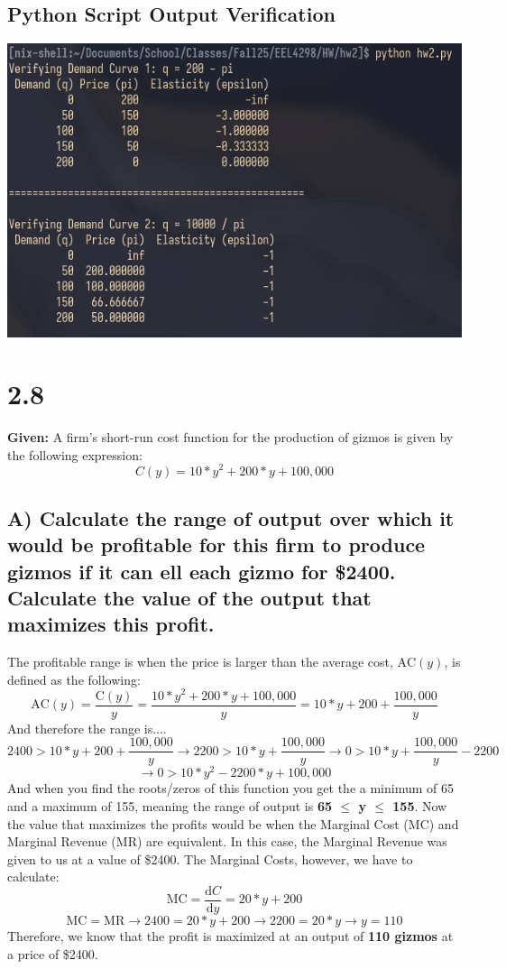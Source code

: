 \documentclass{article}
\begin{document}
\subsection{Python Script Output Verification}
\includegraphics[width=\textwidth]{apple.png}

\pagebreak
\section{2.8}
\textbf{Given:} A firm's short-run cost function for the production of gizmos is given by the following expression: $$ C(y) = 10*y^2 + 200*y + 100,000 $$

\subsection{A) Calculate the range of output over which it would be profitable for this firm to produce gizmos if it can ell each gizmo for \$2400. Calculate the value of the output that maximizes this profit.}
The profitable range is when the price is larger than the average  cost, $\text{AC}(y)$, is defined as the following:
$$ \text{AC}(y) = \frac{\text{C}(y)}{y} = \frac{10*y^2 + 200*y + 100,000}{y} = 10*y + 200 + \frac{100,000}{y}$$
And therefore the range is....
$$ 2400 > 10*y + 200 + \frac{100,000}{y} \rightarrow 2200 > 10*y + \frac{100,000}{y} \rightarrow 0 > 10*y + \frac{100,000}{y} - 2200 $$
$$ \rightarrow 0 > 10*y^2 - 2200*y + 100,000 $$
And when you find the roots/zeros of this function you get the a minimum of 65 and a maximum of 155, meaning the range of output is \textbf{65 $\le$ y $\le$ 155}. \newline
Now the value that maximizes the profits would be when the Marginal Cost (MC) and Marginal Revenue (MR) are equivalent. In this case, the Marginal Revenue was given to us at a value of \$2400. The Marginal Costs, however, we have to calculate:
$$ \text{MC} = \frac{\text{d}C}{\text{d}y} = 20*y + 200$$
$$ \text{MC} = \text{MR} \rightarrow 2400 = 20*y + 200 \rightarrow 2200 = 20*y \rightarrow y = 110$$
Therefore, we know that the profit is maximized at an output of \textbf{110 gizmos} at a price of \$2400.
\end{document}
